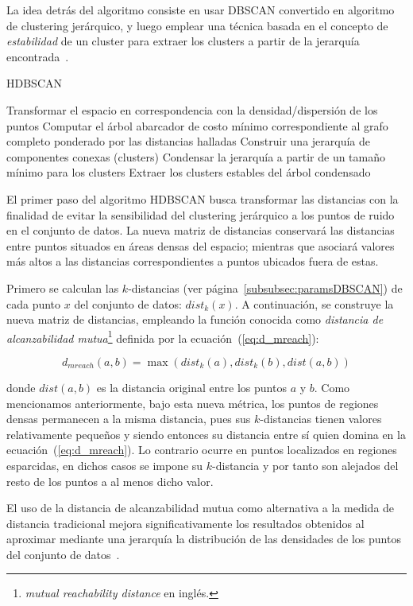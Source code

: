 La idea detrás del algoritmo consiste en usar DBSCAN convertido en algoritmo de clustering jerárquico, y luego emplear una técnica basada en el concepto de \textit{estabilidad} de un cluster para extraer los clusters a partir de la jerarquía encontrada~\cite{McInnes17}.

\begin{algorithm}
    \caption{HDBSCAN}
    \label{algorithm:HDBSCAN}
    Transformar el espacio en correspondencia con la densidad/dispersión de los puntos\;
    Computar el árbol abarcador de costo mínimo correspondiente al grafo completo ponderado por las distancias halladas\;
    Construir una jerarquía de componentes conexas (clusters)\;
    Condensar la jerarquía a partir de un tamaño mínimo para los clusters\;
    Extraer los clusters estables del árbol condensado\;
\end{algorithm}

El primer paso del algoritmo HDBSCAN busca transformar las distancias con la finalidad de evitar la sensibilidad del clustering jerárquico a los puntos de ruido en el conjunto de datos.
La nueva matriz de distancias conservará las distancias entre puntos situados en áreas densas del espacio;
mientras que asociará valores más altos a las distancias correspondientes a puntos ubicados fuera de estas.

Primero se calculan las $k$-distancias (ver página~\ref{subsubsec:paramsDBSCAN}) de cada punto $x$ del conjunto de datos: $dist_k(x)$.
A continuación, se construye la nueva matriz de distancias, empleando la función conocida como \textit{distancia de alcanzabilidad mutua}\footnote{\textit{mutual reachability distance} en inglés.} definida por la ecuación~(\ref{eq:d_mreach}):

\begin{equation}
    \label{eq:d_mreach}
    d_{mreach}(a,b)=\max(dist_k(a), dist_k(b), dist(a,b))
\end{equation}

\noindent
donde $dist(a,b)$ es la distancia original entre los puntos $a$ y $b$.
Como mencionamos anteriormente, bajo esta nueva métrica, los puntos de regiones densas permanecen a la misma distancia, pues sus $k$-distancias tienen valores relativamente pequeños y siendo entonces su distancia entre sí quien domina en la ecuación~(\ref{eq:d_mreach}).
Lo contrario ocurre en puntos localizados en regiones esparcidas, en dichos casos se impone su $k$-distancia y por tanto son alejados del resto de los puntos a al menos dicho valor.

El uso de la distancia de alcanzabilidad mutua como alternativa a la medida de distancia tradicional mejora significativamente los resultados obtenidos al aproximar mediante una jerarquía la distribución de las densidades de los puntos del conjunto de datos~\cite{Eldridge15}.

